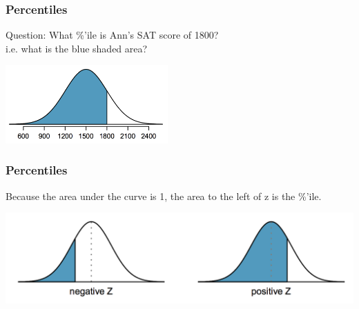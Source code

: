 \documentclass[handout]{beamer}
\newcommand{\blue}[1]{\textcolor{blue2}{#1}}
\begin{document}
\begin{frame}
\frametitle{Percentiles}

\blue{Question}: What \%'ile is Ann's SAT score of 1800?\\

\pause 
i.e. what is the blue shaded area?  
\begin{center}
\includegraphics[height=3cm]{figure/ann_z.png}
\end{center}

\end{frame}






\begin{frame}
\frametitle{Percentiles}
Because the area under the curve is 1, the area to the left of z is the \%'ile.

\begin{center}
\includegraphics[width=\textwidth]{figure/pos_neg_z.png}
\end{center}

\end{frame}
\end{document}
